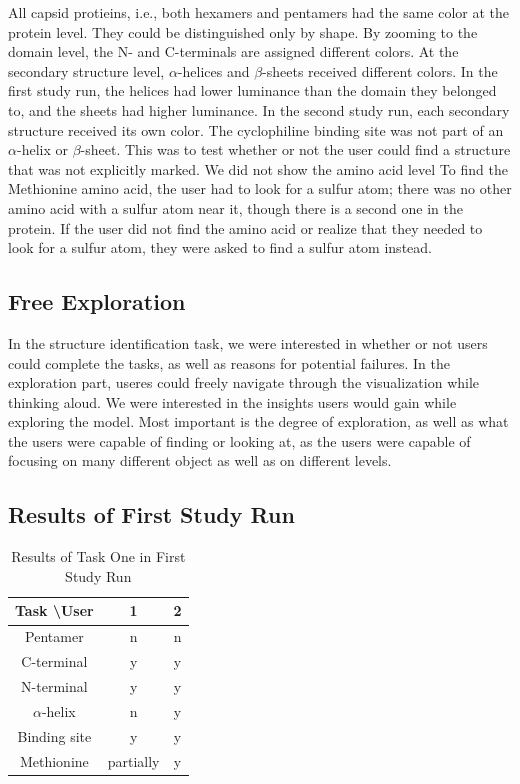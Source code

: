 \documentclass[review,journal]{vgtc}         %
\begin{document}
	All capsid protieins, i.e., both hexamers and pentamers had the same color at the protein level. They could be distinguished only by shape. By zooming to the domain level, the N- and C-terminals are assigned different colors. At the secondary structure level, $\alpha$-helices and $\beta$-sheets received different colors. In the first study run, the helices had lower luminance than the domain they belonged to, and the sheets had higher luminance. In the second study run, each secondary structure received its own color. 
	The cyclophiline binding site was not part of an $\alpha$-helix or $\beta$-sheet.
	This was to test whether or not the user could find a structure that was not explicitly marked. 
	We did not show the amino acid level
	To find the Methionine amino acid, the user had to look for a sulfur atom; there was no other amino acid with a sulfur atom near it, though there is a second one in the protein. 
	If the user did not find the amino acid or realize that they needed to look for a sulfur atom, they were asked to find a sulfur atom instead.
	
	
	
	
	
	\subsection{Free Exploration}
	In the structure identification task, we were interested in whether or not users could complete the tasks, as well as reasons for potential failures. 
	In the exploration part, useres could freely navigate through the visualization while thinking aloud. We were interested in the insights users would gain while exploring the model.
	Most important is the degree of exploration, as well as what the users were capable of finding or looking at, as the users were capable of focusing on many different object as well as on different levels.
	
	\subsection{Results of First Study Run}
	\begin{table}
		
		\centering
		\begin{tabular}{| c | c | c |}
			\hline
			Task \textbackslash User & 1 & 2  \\
			\hline
			Pentamer       & n & n \\
			\hline
			C-terminal     & y & y \\
			\hline
			N-terminal     & y & y \\
			\hline
			$\alpha$-helix & n & y \\
			\hline
			Binding site   & y & y\\
			\hline
			Methionine      & partially & y \\
			\hline
		\end{tabular}
		\label{tableIterationOne}		
		\caption{Results of Task One in First Study Run}
	\end{table}
	
\end{document}
